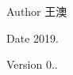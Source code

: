 \begin{DoxyAuthor}{Author}
王澳 
\end{DoxyAuthor}
\begin{DoxyDate}{Date}
2019. 
\end{DoxyDate}
\begin{DoxyVersion}{Version}
0.. 
\end{DoxyVersion}
